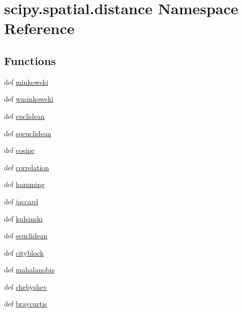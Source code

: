 \hypertarget{namespacescipy_1_1spatial_1_1distance}{}\section{scipy.\+spatial.\+distance Namespace Reference}
\label{namespacescipy_1_1spatial_1_1distance}
\subsection*{Functions}
\begin{DoxyCompactItemize}
\item 
def \hyperlink{namespacescipy_1_1spatial_1_1distance_a42f964c9b59729e10ee81440c20b682c}{minkowski}
\item 
def \hyperlink{namespacescipy_1_1spatial_1_1distance_aad6bcf15a40337aa59d8c4b652efb7ac}{wminkowski}
\item 
def \hyperlink{namespacescipy_1_1spatial_1_1distance_a108434d094539dcfbae6bc35f488108a}{euclidean}
\item 
def \hyperlink{namespacescipy_1_1spatial_1_1distance_a58d74cd7cf9313f0bf10afc5037a9a98}{sqeuclidean}
\item 
def \hyperlink{namespacescipy_1_1spatial_1_1distance_a8b96cda5be045e1cec1c34c06c37c3c0}{cosine}
\item 
def \hyperlink{namespacescipy_1_1spatial_1_1distance_a588f9c43c1859788389c383870c337c8}{correlation}
\item 
def \hyperlink{namespacescipy_1_1spatial_1_1distance_a2c5f8a0b13edfdf2152a08694e390681}{hamming}
\item 
def \hyperlink{namespacescipy_1_1spatial_1_1distance_a68a9627afaa09b2dd14b6d938ae0dc0b}{jaccard}
\item 
def \hyperlink{namespacescipy_1_1spatial_1_1distance_ad9fa0f1a4b1c67bf0c767594f4f0910d}{kulsinski}
\item 
def \hyperlink{namespacescipy_1_1spatial_1_1distance_a3e57a4b6dbe657d7e38f9daa6eba315a}{seuclidean}
\item 
def \hyperlink{namespacescipy_1_1spatial_1_1distance_ac029e0f4e7b7808756169861c3b1574d}{cityblock}
\item 
def \hyperlink{namespacescipy_1_1spatial_1_1distance_a3c5d20e0351fcf7e47cbd73ac65babac}{mahalanobis}
\item 
def \hyperlink{namespacescipy_1_1spatial_1_1distance_a7de603cc98f4334e5a9cdf6dac8c2acf}{chebyshev}
\item 
def \hyperlink{namespacescipy_1_1spatial_1_1distance_a2282f96c4e20f20f04e371ff6955b500}{braycurtis}

\end{DoxyCompactItemize}
